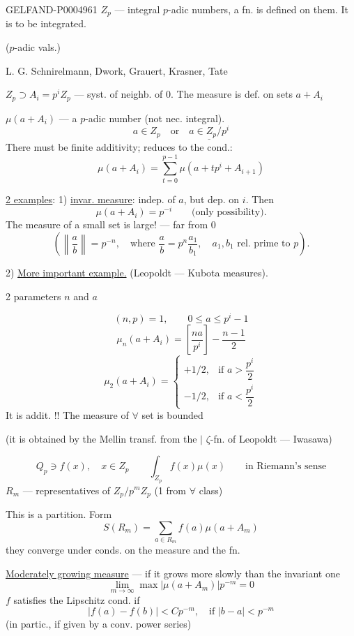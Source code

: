 \begin{GelfandAdjacentEvidence}{GELFAND-P000496}{1}
$Z_p$ — integral $p$-adic numbers, a fn. is defined on them. It is to be integrated.

($p$-adic vals.)

 L. G. Schnirelmann, Dwork, Grauert, Krasner, Tate

$Z_p\supset A_i=p^iZ_p$ — syst. of neighb. of $0$.
The measure is def. on sets $a+A_i$

$\mu(a+A_i)$ — a $p$-adic number (not nec. integral).
\[
a\in Z_p\quad\text{or}\quad \underline{a\in Z_p/p^i}
\]
There must be finite additivity; reduces to the cond.:
\[
\mu(a+A_i)=\sum_{t=0}^{p-1}\mu(a+tp^i+A_{i+1})
\]

\uline{2 examples}: 1) \uline{invar. measure}: indep. of $a$, but dep. on $i$.
Then
\[
\mu(a+A_i)=p^{-i}\qquad\text{(only possibility).}
\]
The measure of a small set is large! — far from $0$
\[
\left(\left\|\frac ab\right\|=p^{-n},\quad
\text{where }\frac ab=p^n\frac{a_1}{b_1},\quad
a_1,b_1\text{ rel. prime to }p\right).
\]

2) \uline{More important example.} (Leopoldt — Kubota measures).
\begin{flushright}
2 parameters $n$ and $a$
\end{flushright}
\[
(n,p)=1,\qquad 0\le a\le p^i-1
\]
\[
\mu_n(a+A_i)=\left[\frac{na}{p^i}\right]-\frac{n-1}{2}
\]
\[
\mu_2(a+A_i)=
\begin{cases}
+1/2,&\text{if }a>\dfrac{p^i}{2}\\
-1/2,&\text{if }a<\dfrac{p^i}{2}
\end{cases}
\]
It is addit. !! The measure of $\forall$ set is bounded

(it is obtained by the Mellin transf. from the $\vert$ $\zeta$-fn. of Leopoldt — Iwasawa)
\end{GelfandAdjacentEvidence}


\[
Q_p\ni f(x),\quad x\in Z_p\qquad
\int_{Z_p}f(x)\mu(x)\qquad\text{in Riemann’s sense}
\]
$R_m$ — representatives of $Z_p/p^mZ_p$ (1 from $\forall$ class)

This is a partition. Form
\[
S(R_m)=\sum_{a\in R_m}f(a)\mu(a+A_m)
\]
they converge under conds. on the measure and the fn.

\uline{Moderately growing measure} — if it grows more slowly than the invariant one
\[
\lim_{m\to\infty}\max|\mu(a+A_m)|p^{-m}=0
\]
$f$ satisfies the Lipschitz cond. if
\[
 |f(a)-f(b)|<Cp^{-m},\quad\text{if }|b-a|<p^{-m}
\]
(in partic., if given by a conv. power series)

